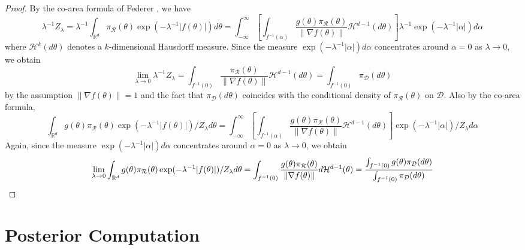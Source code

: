 \documentclass[10pt]{article}
\newcommand{\leo}[1]{{\color{blue}{Leo: #1}}}
\newcommand{\mc}[1]{\mathcal{#1}}
\DeclareMathOperator{\1}{\mathbbm{1}}
\begin{document}
\leo{I'm not sure if $\| \nabla f \| \equiv 1$ is easy to have, for example how to scale $f(x,y)=x^3+y^3 -1$ uniformly to have $\| \nabla f \| \equiv 1$?}
\begin{proof}[Proof]
	By the co-area formula of Federer \citep{diaconis2013manifold}, we have
	\begin{equation}
	\lambda^{-1} Z_\lambda
	= \lambda^{-1} \int_{\mathbb{R}^d} \pi_{\mc R}(\theta) \exp(- \lambda^{-1} |f(\theta)|)  d \theta
	= \int_{-\infty}^{\infty}  \left[ \int_{f^{-1}(\alpha)} \frac{ g(\theta) \pi_{\mc R}(\theta) }{ \| \nabla f(\theta) \| } \mathcal{H}^{d-1}(d \theta) \right]  \lambda^{-1} \exp(- \lambda^{-1} |\alpha| ) d \alpha
	\end{equation}
	where $\mathcal{H}^{k}(d \theta)$ denotes a $k$-dimensional Hausdorff measure. Since the measure $\exp(- \lambda^{-1} |\alpha| ) d \alpha$ concentrates around $\alpha = 0$ as $\lambda \to 0$, we obtain
	\begin{equation}
	\lim_{\lambda \to 0} \lambda^{-1} Z_\lambda
	= \int_{f^{-1}(0)} \frac{ \pi_{\mc R}(\theta) }{ \| \nabla f(\theta) \| } \mathcal{H}^{d-1}(d \theta) 
	= \int_{f^{-1}(0)} \pi_{\mc D}(d \theta)
	\end{equation}
	by the assumption $\| \nabla f(\theta) \|  = 1$ and the fact that $\pi_{\mc D}(d \theta)$ coincides with the conditional density of $\pi_{\mc R}(\theta)$ on $\mc D$. Also by the co-area formula,
	\begin{equation}
	\int_{\mathbb{R}^d} g(\theta) \pi_{\mc R}(\theta) \exp(- \lambda^{-1} |f(\theta)|)  /  Z_\lambda d \theta
	= \int_{-\infty}^{\infty}  \left[ \int_{f^{-1}(\alpha)} \frac{ g(\theta) \pi_{\mc R}(\theta) }{ \| \nabla f(\theta) \| } \mathcal{H}^{d-1}(d \theta) \right]  \exp(- \lambda^{-1} |\alpha| )  /  Z_\lambda d \alpha
	\end{equation}
	Again, since the measure $\exp(- \lambda^{-1} |\alpha| ) d \alpha$ concentrates around $\alpha = 0$ as $\lambda \to 0$, we obtain
	\begin{equation}
	\lim_{\lambda \to 0} \int_{\mathbb{R}^d} g(\theta) \pi_{\mc R}(\theta) \exp(- \lambda^{-1} |f(\theta)|)  /  Z_\lambda d \theta
	= \int_{f^{-1}(0)} \frac{ g(\theta) \pi_{\mc R}(\theta) }{ \| \nabla f(\theta) \| } d \mathcal{H}^{d-1}(\theta) 
	= \frac{\int_{f^{-1}(0)} g(\theta) \pi_{\mc D}(d \theta)}{\int_{f^{-1}(0)} \pi_{\mc D}(d \theta)} \qedhere
	\end{equation}
\end{proof}


\section{Posterior Computation}
\end{document}
